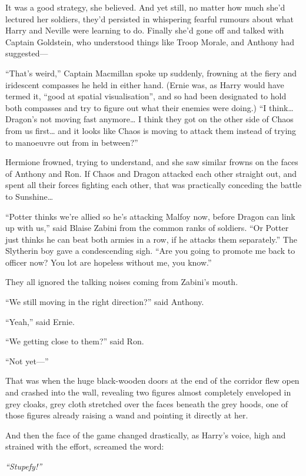 It was a good strategy, she believed. And yet still, no matter how much
she'd lectured her soldiers, they'd persisted in whispering fearful
rumours about what Harry and Neville were learning to do. Finally she'd
gone off and talked with Captain Goldstein, who understood things like
Troop Morale, and Anthony had suggested---

``That's weird,'' Captain Macmillan spoke up suddenly, frowning at the
fiery and iridescent compasses he held in either hand. (Ernie was, as
Harry would have termed it, ``good at spatial visualisation'', and so
had been designated to hold both compasses and try to figure out what
their enemies were doing.) ``I think\ldots{} Dragon's not moving fast
anymore\ldots{} I think they got on the other side of Chaos from us
first\ldots{} and it looks like Chaos is moving to attack them instead
of trying to manoeuvre out from in between?''

Hermione frowned, trying to understand, and she saw similar frowns on
the faces of Anthony and Ron. If Chaos and Dragon attacked each other
straight out, and spent all their forces fighting each other, that was
practically conceding the battle to Sunshine\ldots{}

``Potter thinks we're allied so he's attacking Malfoy now, before Dragon
can link up with us,'' said Blaise Zabini from the common ranks of
soldiers. ``Or Potter just thinks he can beat both armies in a row, if
he attacks them separately.'' The Slytherin boy gave a condescending
sigh. ``Are you going to promote me back to officer now? You lot are
hopeless without me, you know.''

They all ignored the talking noises coming from Zabini's mouth.

``We still moving in the right direction?'' said Anthony.

``Yeah,'' said Ernie.

``We getting close to them?'' said Ron.

``Not yet---''

That was when the huge black-wooden doors at the end of the corridor
flew open and crashed into the wall, revealing two figures almost
completely enveloped in grey cloaks, grey cloth stretched over the faces
beneath the grey hoods, one of those figures already raising a wand and
pointing it directly at her.

And then the face of the game changed drastically, as Harry's voice,
high and strained with the effort, screamed the word:

\emph{``Stupefy!''}

